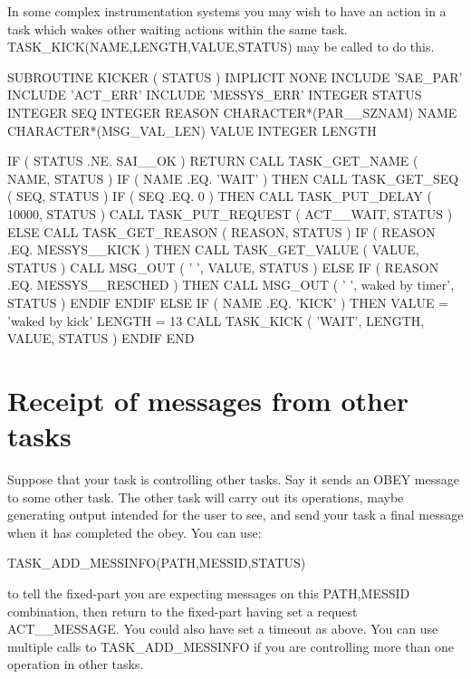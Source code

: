 \documentclass[twoside,11pt,nolof]{starlink}
\begin{document}
In some complex instrumentation systems you may wish to have an action in a
task which wakes other waiting actions within the same task.
TASK\_KICK(NAME,LENGTH,VALUE,STATUS) may be called to do this.

\begin{small}
\begin{terminalv}
      SUBROUTINE KICKER ( STATUS )
      IMPLICIT NONE
      INCLUDE 'SAE_PAR'
      INCLUDE 'ACT_ERR'
      INCLUDE 'MESSYS_ERR'
      INTEGER STATUS
      INTEGER SEQ
      INTEGER REASON
      CHARACTER*(PAR__SZNAM) NAME
      CHARACTER*(MSG_VAL_LEN) VALUE
      INTEGER LENGTH

      IF ( STATUS .NE. SAI__OK ) RETURN
      CALL TASK_GET_NAME ( NAME, STATUS )
      IF ( NAME .EQ. 'WAIT' ) THEN
         CALL TASK_GET_SEQ ( SEQ, STATUS )
         IF ( SEQ .EQ. 0 ) THEN
            CALL TASK_PUT_DELAY ( 10000, STATUS )
            CALL TASK_PUT_REQUEST ( ACT__WAIT, STATUS )
         ELSE
            CALL TASK_GET_REASON ( REASON, STATUS )
            IF ( REASON .EQ. MESSYS__KICK ) THEN
               CALL TASK_GET_VALUE ( VALUE, STATUS )
               CALL MSG_OUT ( ' ', VALUE, STATUS )
            ELSE IF ( REASON .EQ. MESSYS__RESCHED ) THEN
               CALL MSG_OUT ( ' ', waked by timer', STATUS )
            ENDIF
         ENDIF
      ELSE IF ( NAME .EQ. 'KICK' ) THEN
         VALUE = 'waked by kick'
         LENGTH = 13
         CALL TASK_KICK ( 'WAIT', LENGTH, VALUE, STATUS )
      ENDIF
      END
\end{terminalv}
\end{small}

\section{Receipt of messages from other tasks
}

Suppose that your task is controlling other tasks. Say it sends an OBEY
message to some other task. The other task will carry out its
operations, maybe generating output intended for the user to see, and
send your task a final message when it has completed the obey. You can
use:
\begin{small}
\begin{terminalv}
TASK_ADD_MESSINFO(PATH,MESSID,STATUS)
\end{terminalv}
\end{small}
to tell the fixed-part you are
expecting messages on this PATH,MESSID combination, then return to the
fixed-part having set a request ACT\_\_MESSAGE. You could also have set a
timeout as above. You can use multiple calls to TASK\_ADD\_MESSINFO if you
are controlling more than one operation in other tasks.
\end{document}
